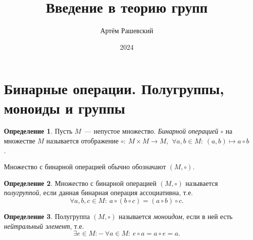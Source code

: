 \documentclass[a4paper, 14pt]{extarticle}
\title{Введение в теорию групп}
\author{Артём Рашевский}
\affil{ФКН ВГУ}
\date{2024}
\newcommand{\suchthat}{{:}{-} \ }
\theoremstyle{definition}
\newtheorem{definition}{Определение}
\theoremstyle{plain}
\numberwithin{theorem}{section}
\numberwithin{definition}{section}
\numberwithin{statement}{section}
\numberwithin{lemma}{section}
\numberwithin{consequence}{section}
\begin{document}
	\maketitle
	\thispagestyle{empty}
	\newpage
	\tableofcontents
	\newpage
	\section{Бинарные операции. Полугруппы, моноиды и группы}
		\begin{definition}
			Пусть $M$~--- непустое множество. \textit{Бинарной операцией} $\circ$ на множестве $M$ называется отображение 
			${\circ{:} \ M \times M \rightarrow M}$, ${\ \forall a,b \in M{:} \ (a, b) \mapsto a \circ b}$.
		\end{definition}

		Множество с бинарной операцией обычно обозначают $(M, \circ).$
	
		\begin{definition}
			Множество с бинарной операцией $(M, \circ)$ называется \textit{полугруппой}, если данная бинарная операция
			ассоциативна, т.е.
			\begin{equation*}
				\forall a, b, c \in M{:} \ a \circ (b \circ c) = (a \circ b) \circ c.
			\end{equation*}
		\end{definition}

		\begin{definition}
			Полугруппа $(M, \circ)$ называется \textit{моноидом}, если в ней есть \textit{нейтральный элемент}, т.е.
			\begin{equation*}
				\exists e \in M \suchthat \forall a \in M{:} \ e \circ a = a \circ e = a.
			\end{equation*}
		\end{definition}
\end{document}
